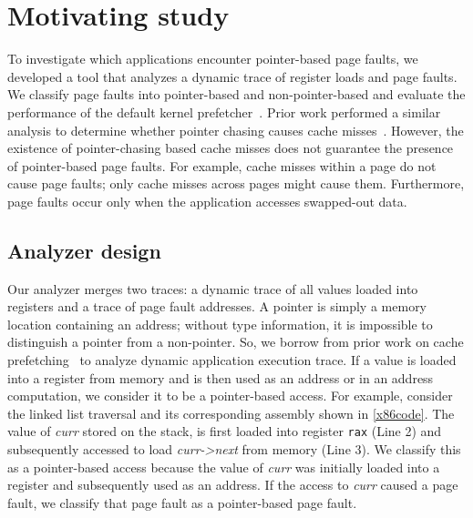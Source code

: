 
\section{Motivating study} 
\label{sec:3}

    

To investigate which applications encounter pointer-based page faults, we developed a tool that analyzes a dynamic trace of register loads and page faults. We classify page faults into pointer-based and non-pointer-based and evaluate the performance of the default kernel prefetcher~\cite{vma-readahead}. Prior work performed a similar analysis to determine whether pointer chasing causes cache misses~\cite{cache-analysis}. However, the existence of pointer-chasing based cache misses does not guarantee the presence of pointer-based page faults. 
For example, cache misses within a page do not cause page faults; only cache misses across pages might cause them. 
Furthermore, page faults occur only when the application accesses swapped-out data.

\subsection{Analyzer design} 
Our analyzer merges two traces: a dynamic trace of all values loaded into registers and a trace of page fault addresses. A pointer is simply a memory location containing an address; without type information, it is impossible to distinguish a pointer from a non-pointer. 
So, we borrow from prior work on cache prefetching~\cite{cache-analysis} to analyze dynamic application execution trace. If a value is loaded into a register from memory and is then used as an address or in an address computation, we consider it to be a pointer-based access. 
For example, consider the linked list traversal and its corresponding assembly shown in \autoref{x86code}. 
The value of \textit{curr} stored on the stack, is first loaded into register \texttt{rax} (Line 2) and subsequently accessed to load \textit{curr->next} from memory (Line 3). 
We classify this as a pointer-based access because the value of \textit{curr} was initially loaded into a register and subsequently used as an address. 
If the access to \textit{curr} caused a page fault, we classify that page fault as a pointer-based page fault.

